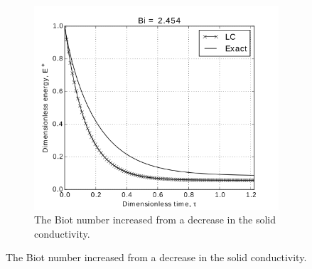 \begin{figure}
        \centering
        \begin{subfigure}[b]{0.5\textwidth}
                \includegraphics[width=\textwidth]{chapters/figures/LC-analytic-sphere-in-fluid-Bi-2a}
                \caption{The Biot number increased from a decrease in the solid conductivity.}
				\label{fig:LC-analytic-sphere-in-fluid-Bi-2a}
        \end{subfigure}%
        

\end{figure}
